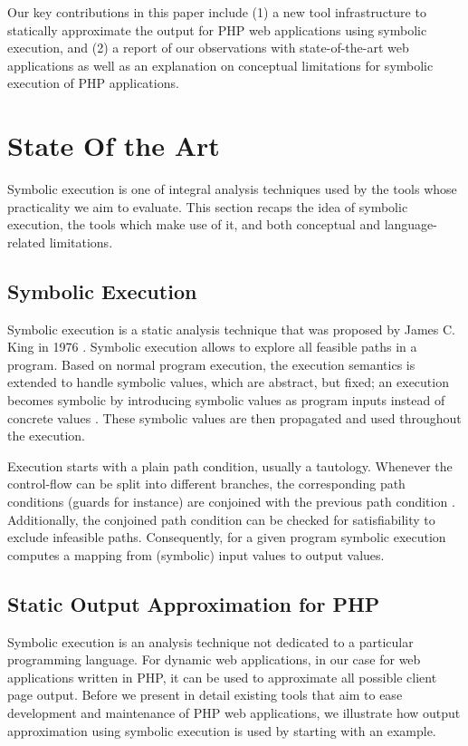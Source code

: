 \documentclass[preprint]{sig-alternate-05-2015}
\begin{document}
Our key contributions in this paper include (1) a new tool infrastructure to
statically approximate the output for PHP web applications using symbolic
execution, and (2) a report of our observations with state-of-the-art web
applications as well as an explanation on conceptual limitations for symbolic
execution of PHP applications.

\section{State Of the Art}\label{sec:stateoftheart}
Symbolic execution is one of integral analysis techniques used by the tools
whose practicality we aim to evaluate. This section recaps the idea of symbolic
execution, the tools which make use of it, and both conceptual and
language-related limitations.

\subsection{Symbolic Execution}
Symbolic execution is a static analysis technique that was proposed by James C.
King in 1976 \cite{King1976}. Symbolic execution allows to explore all feasible
paths in a program. Based on normal program execution, the execution semantics
is extended to handle symbolic values, which are abstract, but fixed; an
execution becomes symbolic by introducing symbolic values as program inputs
instead of concrete values \cite{King1976,Darringer1978}. These symbolic values
are then propagated and used throughout the execution.

Execution starts with a plain path condition, usually a tautology. Whenever the
control-flow can be split into different branches, the corresponding path
conditions (guards for instance) are conjoined with the previous path condition
\cite{King1976}. Additionally, the conjoined path condition can be checked for
satisfiability to exclude infeasible paths. Consequently, for a given program
symbolic execution computes a mapping from (symbolic) input values to output values.

\subsection{Static Output Approximation for PHP} \label{sec:workflow}
Symbolic execution is an analysis technique not dedicated to a particular
programming language. For dynamic web applications, in our case for web
applications written in PHP, it can be used to approximate all possible client
page output. Before we present in detail existing tools that aim to ease
development and maintenance of PHP web applications, we illustrate how output
approximation using symbolic execution is used by starting with an example.
\end{document}
